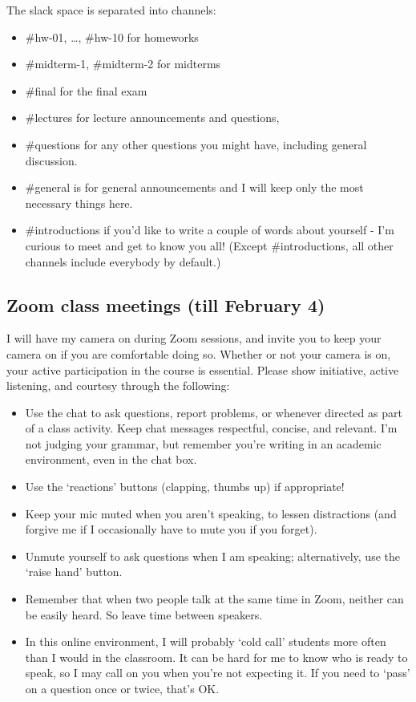 \documentclass[oneside,11pt]{amsart}
\begin{document}
The slack space is separated into channels:
\begin{itemize}
	\item 
		\#hw-01, \ldots,  \#hw-10 for homeworks
	\item 
\#midterm-1, \#midterm-2 for midterms 
\item 
\#final for the final exam
\item 
\#lectures for lecture announcements and questions, 
\item 
\#questions for any other questions you might have, including general discussion.
\item 
\#general is for general announcements and I will keep only the most necessary things here.
\item 
\#introductions if you’d like to write a couple of words about yourself - I’m curious to meet and get to know you all!
(Except \#introductions, all other channels include everybody by default.)
\end{itemize}

\subsection{Zoom class meetings (till February 4)}

I will have my camera on during Zoom sessions, and invite you to keep
your camera on if you are comfortable doing so. Whether or not your
camera is on, your active participation in the course is essential.
Please show initiative, active listening, and courtesy through the
following: 
\begin{itemize}
	\item 
Use the chat to ask questions, report problems, or whenever directed as part of a class activity. Keep chat messages respectful, concise, and relevant. I’m not judging your grammar, but remember you’re writing in an academic environment, even in the chat box. 
\item 
Use the ‘reactions’ buttons (clapping, thumbs up) if appropriate!
\item 
Keep your mic muted when you aren’t speaking, to lessen distractions (and forgive me if I occasionally have to mute you if you forget).
\item 
	Unmute yourself to ask questions when I am speaking; alternatively,
	use the ‘raise hand’ button.
\item 
Remember that when two people talk at the same time in Zoom, neither can be easily heard. 
So leave time between speakers.
\item 
In this online environment, I will probably ‘cold call’ students more often than I would in the classroom. It can be hard for me to know who is ready to speak, so I may call on you when you’re not expecting it. If you need to ‘pass’ on a question once or twice, that’s OK.
\end{itemize}
\end{document}
